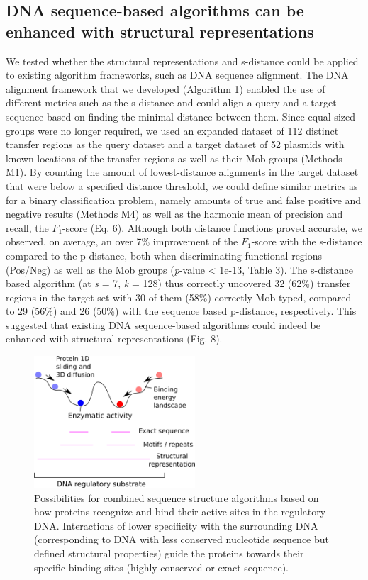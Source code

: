 \documentclass[10pt]{article}
\begin{document}
\subsection{DNA sequence-based algorithms can be enhanced with structural representations}
We tested whether the structural representations and s-distance could be applied to existing algorithm frameworks, such as DNA sequence alignment. The DNA alignment framework that we developed (Algorithm 1) enabled the use of different metrics such as the s-distance and could align a query and a target sequence based on finding the minimal distance between them. Since equal sized groups were no longer required, we used an expanded dataset of 112 distinct transfer regions as the query dataset and a target dataset of 52 plasmids with known locations of the transfer regions as well as their Mob groups \cite{Zrimec2020-wx} (Methods M1). By counting the amount of lowest-distance alignments in the target dataset that were below a specified distance threshold, we could define similar metrics as for a binary classification problem, namely amounts of true and false positive and negative results (Methods M4) as well as the harmonic mean of precision and recall, the $F_1$-score (Eq. 6). Although both distance functions proved accurate, we observed, on average, an over 7\% improvement of the $F_1$-score with the s-distance compared to the p-distance, both when discriminating functional regions (Pos/Neg) as well as the Mob groups (\textit{p}-value \textless{} 1e-13, Table 3). The s-distance based algorithm (at \textit{s} = 7, \textit{k} = 128) thus correctly uncovered 32 (62\%) transfer regions in the target set with 30 of them (58\%) correctly Mob typed, compared to 29 (56\%) and 26 (50\%) with the sequence based p-distance, respectively. This suggested that existing DNA sequence-based algorithms could indeed be enhanced with structural representations \cite{Marcovitz2013-kg,Levo2015-iu,Slattery2014-ne,Rohs2009-hm} (Fig. 8).

\begin{figure}[ht]
  \centering
  \includegraphics[width=6cm,keepaspectratio]{smir_fig_algorithms.png}
  \caption{Possibilities for combined sequence structure algorithms based on how proteins recognize and bind their active sites in the regulatory DNA. Interactions of lower specificity with the surrounding DNA (corresponding to DNA with less conserved nucleotide sequence but defined structural properties) guide the proteins towards their specific binding sites (highly conserved or exact sequence).}
\end{figure}
\end{document}
